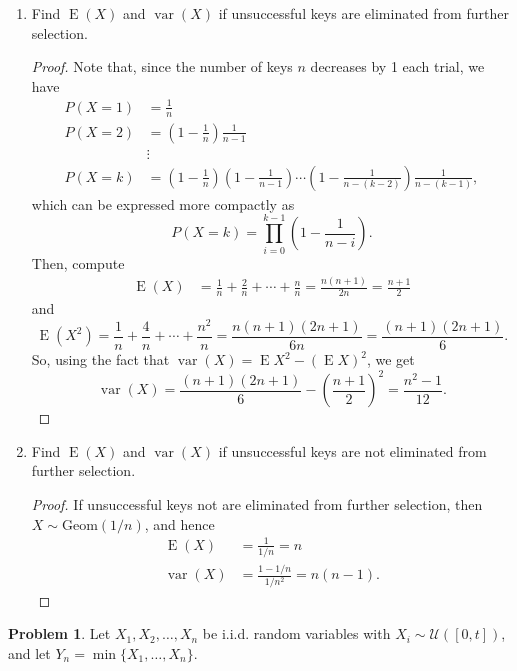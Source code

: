 \documentclass[oneside,reqno]{amsart}
\DeclareMathOperator{\E}{\mathrm{E}}
\DeclareMathOperator{\var}{\mathrm{var}}
\newcommand{\Ucal}{\mathcal{U}}
\theoremstyle{definition}
\newtheorem{prob}{Problem}
\begin{document}
\begin{enumerate}
\item
Find $\E(X)$ and $\var(X)$  if unsuccessful keys are eliminated from further selection.
\begin{proof}
Note that, since the number of keys $n$ decreases by 1 each trial, we have
\begin{align*}
	P(X=1) &= \frac{1}{n} \\
	P(X=2) &= \left(1-\frac{1}{n}\right) \frac{1}{n-1} \\
	&\vdots \\
	P(X=k) &= \left(1-\frac{1}{n}\right)\left(1-\frac{1}{n-1}\right) \cdots \left(1-\frac{1}{n-(k-2)}\right) \frac{1}{n-(k-1)},
\end{align*}
which can be expressed more compactly as 
\[
	P(X= k) = \prod_{i=0}^{k-1} \left(1-\frac{1}{n-i}\right).
\]
Then, compute   
\begin{align*}
	\E (X) &= \frac{1}{n} + \frac{2}{n} + \cdots + \frac{n}{n} = \frac{n(n+1)}{2n} = \frac{n+1}{2} 
\end{align*}
and
\[
	\E (X^2) = \frac{1}{n} + \frac{4}{n} + \cdots + \frac{n^2}{n} = \frac{n(n+1)(2n+1)}{6n}=\frac{(n+1)(2n+1)}{6}.
\]
So, using the fact that $\var(X) = \E X^2 - (\E X)^2$, we get
\[
	\var(X) = \frac{(n+1)(2n+1)}{6} - \left(  \frac{n+1}{2}  \right)^2 = \frac{n^2-1}{12}.
\]
\end{proof}
\item
Find $\E(X)$ and $\var(X)$ if unsuccessful keys are not eliminated from further selection.
\begin{proof}
If unsuccessful keys not are eliminated from further selection, then $X \sim \text{Geom}(1/n)$, and hence 
\begin{align*}
	\E (X) &= \frac{1}{1/n} = n \\
	\var(X) &= \frac{1-1/n}{1/n^2} = n (n-1).
\end{align*}
\end{proof}

\end{enumerate}


\begin{prob}
Let $X_1,X_2,\dotsc, X_n$ be i.i.d. random variables with $X_i \sim \Ucal([0,t])$, and let $Y_n = \min\{ X_1,\dotsc, X_n\}$.
\end{prob}
\end{document}
